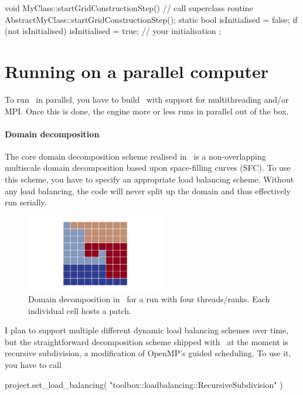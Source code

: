 \begin{code}
void MyClass::startGridConstructionStep() {
  // call superclass routine
  AbstractMyClass::startGridConstructionStep();
  static bool isInitialised = false;
  if (not isInitialised) {
    isInitialised = true;
    // your initialisation
  }
};
\end{code}

\section{Running on a parallel computer}

To run \ExaHyPE\ in parallel, you have to build \Peano\ with support for
multithreading and/or MPI.
Once this is done, the engine more or less runs in parallel out of the box.


\paragraph{Domain decomposition}
The core domain decomposition scheme realised in \ExaHyPE\ is a non-overlapping
multiscale domain decomposition based upon space-filling curves (SFC).
To use this scheme, you have to specify an appropriate load balancing scheme.
Without any load balancing, the code will never split up the domain and thus
effectively run serially.

\begin{figure}
 \begin{center}
  \includegraphics[width=0.54\textwidth]{60_exahype/domain-decomposition.png}
 \end{center}
 \caption{
  Domain decomposition in \ExaHyPE\ for a run with four threads/ranks. Each
  individual cell hosts a patch.
 }
\end{figure}


I plan to support multiple different dynamic load balancing schemes over time,
but the straightforward decomposition scheme shipped with \Peano\ at the moment
is recursive subdivision, a modification of OpenMP's guided scheduling.
To use it, you have to call
\begin{code}
project.set_load_balancing( "toolbox::loadbalancing::RecursiveSubdivision" )
\end{code}


